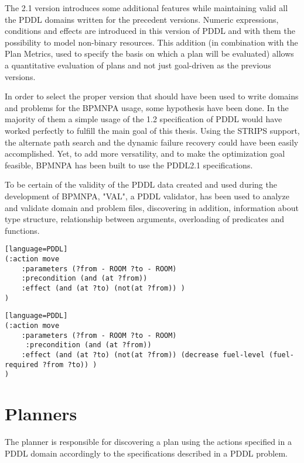 The 2.1 version introduces some additional features while maintaining valid all the PDDL domains written for the precedent versions. 
Numeric expressions, conditions and effects are introduced in this version of PDDL and with them the possibility to model non-binary resources. 
This addition (in combination with the Plan Metrics, used to specify the basis on which a plan will be evaluated) allows a quantitative evaluation of plans and not just goal-driven as the previous versions.\cite{fox2003pddl2}

In order to select the proper version that should have been used to write domains and problems for the BPMNPA usage, some hypothesis have been done. In the majority of them a simple usage of the 1.2 specification of PDDL would have worked perfectly to fulfill the main goal of this thesis. Using the STRIPS support, the alternate path search and the dynamic failure recovery could have been easily accomplished. Yet, to add more versatility, and to make the optimization goal feasible, BPMNPA has been built to use the PDDL2.1 specifications.

To be certain of the validity of the PDDL data created and used during the development of BPMNPA, "VAL", a PDDL validator, has been used to analyze and validate domain and problem files, discovering in addition, information about type structure, relationship between arguments, overloading of predicates and functions.\cite{VAL}

\begin{lstlisting}[caption=A simple move action according to PDDL1.2][language=PDDL]
(:action move
    :parameters (?from - ROOM ?to - ROOM)
    :precondition (and (at ?from))
    :effect (and (at ?to) (not(at ?from)) )
)
\end{lstlisting}


\begin{lstlisting}[caption=A move action with the cost in terms of fuel according to PDDL2.1][language=PDDL]
(:action move
    :parameters (?from - ROOM ?to - ROOM)
	 :precondition (and (at ?from))
    :effect (and (at ?to) (not(at ?from)) (decrease fuel-level (fuel-required ?from ?to)) )
)
\end{lstlisting}


\section{Planners}
\label{sec:context}
The planner is responsible for discovering a plan using the actions specified in a PDDL domain accordingly to the specifications described in a PDDL problem.

